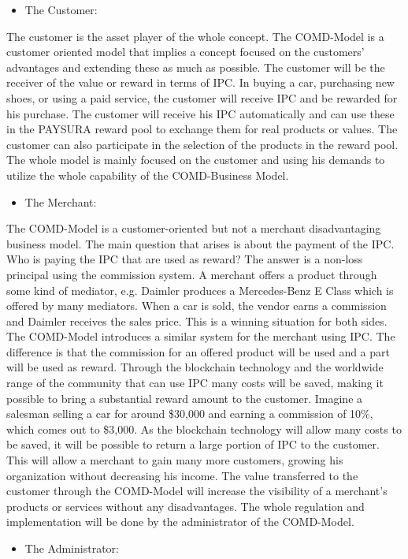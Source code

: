 \documentclass[twoside,onecolumn]{article}
\begin{document}
\begin{itemize}
\item The Customer:
\end{itemize}
The customer is the asset player of the whole concept. The COMD-Model is a customer oriented model that implies a concept focused on the customers' advantages and extending these as much as possible. The customer will be the receiver of the value or reward in terms of IPC. In buying a car, purchasing new shoes, or using a paid service, the customer will receive IPC and be rewarded for his purchase. The customer will receive his IPC automatically and can use these in the PAYSURA reward pool to exchange them for real products or values. The customer can also participate in the selection of the products in the reward pool. The whole model is mainly focused on the customer and using his demands to utilize the whole capability of the COMD-Business Model. 

\begin{itemize}
\item The Merchant:
\end{itemize}

The COMD-Model is a customer-oriented but not a merchant disadvantaging business model. The main question that arises is about the payment of the IPC. Who is paying the IPC that are used as reward? The answer is a non-loss principal using the commission system. A merchant offers a product through some kind of mediator, e.g. Daimler produces a Mercedes-Benz E Class which is offered by many mediators. When a car is sold, the vendor earns a commission and Daimler receives the sales price. This is a winning situation for both sides. The COMD-Model introduces a similar system for the merchant using IPC. The difference is that the commission for an offered product will be used and a part will be used as reward. Through the blockchain technology and the worldwide range of the community that can use IPC many costs will be saved, making it possible to bring a substantial reward amount to the customer. Imagine a salesman selling a car for around \$30,000 and earning a commission of 10\%, which comes out to \$3,000. As the blockchain technology will allow many costs to be saved, it will be possible to return a large portion of IPC to the customer. This will allow a merchant to gain many more customers, growing his organization without decreasing his income. The value transferred to the customer through the COMD-Model will increase the visibility of a merchant's products or services without any disadvantages. The whole regulation and implementation will be done by the administrator of the COMD-Model. 
\begin{itemize}
\item The Administrator:
\end{itemize}
\end{document}
